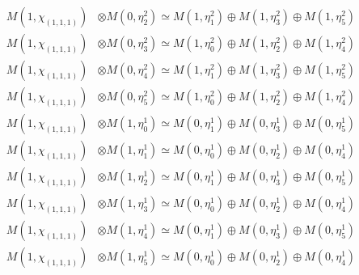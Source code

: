 \begin{align*}
M(1,\chi_{(1,1,1)}) &\otimes M(0,\eta^{2}_{2}) \simeq M(1,\eta^{2}_{1}) \oplus M(1,\eta^{2}_{3}) \oplus M(1,\eta^{2}_{5}) \\
M(1,\chi_{(1,1,1)}) &\otimes M(0,\eta^{2}_{3}) \simeq M(1,\eta^{2}_{0}) \oplus M(1,\eta^{2}_{2}) \oplus M(1,\eta^{2}_{4}) \\
M(1,\chi_{(1,1,1)}) &\otimes M(0,\eta^{2}_{4}) \simeq M(1,\eta^{2}_{1}) \oplus M(1,\eta^{2}_{3}) \oplus M(1,\eta^{2}_{5}) \\
M(1,\chi_{(1,1,1)}) &\otimes M(0,\eta^{2}_{5}) \simeq M(1,\eta^{2}_{0}) \oplus M(1,\eta^{2}_{2}) \oplus M(1,\eta^{2}_{4}) \\
M(1,\chi_{(1,1,1)}) &\otimes M(1,\eta^{1}_{0}) \simeq M(0,\eta^{1}_{1}) \oplus M(0,\eta^{1}_{3}) \oplus M(0,\eta^{1}_{5}) \\
M(1,\chi_{(1,1,1)}) &\otimes M(1,\eta^{1}_{1}) \simeq M(0,\eta^{1}_{0}) \oplus M(0,\eta^{1}_{2}) \oplus M(0,\eta^{1}_{4}) \\
M(1,\chi_{(1,1,1)}) &\otimes M(1,\eta^{1}_{2}) \simeq M(0,\eta^{1}_{1}) \oplus M(0,\eta^{1}_{3}) \oplus M(0,\eta^{1}_{5}) \\
M(1,\chi_{(1,1,1)}) &\otimes M(1,\eta^{1}_{3}) \simeq M(0,\eta^{1}_{0}) \oplus M(0,\eta^{1}_{2}) \oplus M(0,\eta^{1}_{4}) \\
M(1,\chi_{(1,1,1)}) &\otimes M(1,\eta^{1}_{4}) \simeq M(0,\eta^{1}_{1}) \oplus M(0,\eta^{1}_{3}) \oplus M(0,\eta^{1}_{5}) \\
M(1,\chi_{(1,1,1)}) &\otimes M(1,\eta^{1}_{5}) \simeq M(0,\eta^{1}_{0}) \oplus M(0,\eta^{1}_{2}) \oplus M(0,\eta^{1}_{4}) \\
\end{align*}

